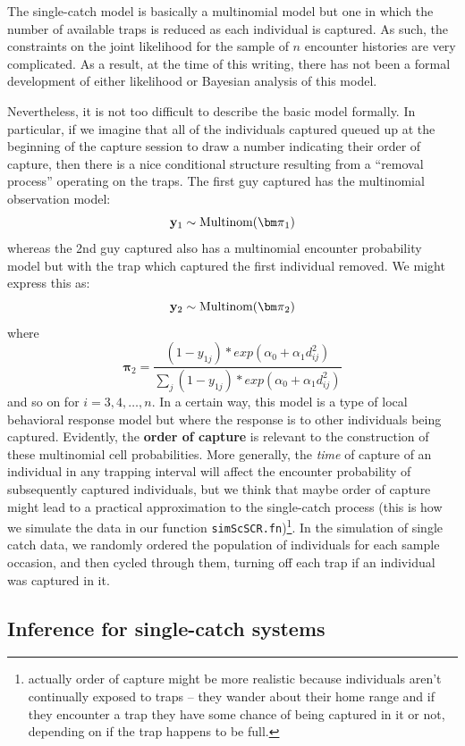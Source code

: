 The single-catch model is basically a multinomial model but one in
which the number of available traps is reduced as each individual is
captured. As such, the constraints on the joint likelihood for the
sample of $n$ encounter histories are very complicated. 
 As a
result, at the time of this writing, there has not been a formal
development of either likelihood or Bayesian analysis of this model.

Nevertheless, it is not too difficult to describe the basic model
formally. In particular, if we imagine that all of the individuals
captured queued up at the beginning of the capture session to draw a
number indicating their order of capture, then there is a nice conditional structure
resulting from a ``removal process'' operating on the traps.  The
first guy captured has the multinomial observation model:
\[
{\bf y}_{1} \sim \mbox{Multinom}({\bm \pi}_{1})
\]
whereas the 2nd guy captured also has a multinomial encounter
probability model but with the trap which captured the first
individual removed. We might express this as:
\[
{\bf y}_{2} \sim \mbox{Multinom}({\bm \pi}_{2})
\]
where
\[
 {\bm \pi}_{2}  = \frac{ (1-y_{1j}) *exp( \alpha_{0} + \alpha_{1}   d_{ij}^{2}) }
{ \sum_{j} (1-y_{1j}) *exp( \alpha_{0} + \alpha_{1}   d_{ij}^{2}) }
\]
and so on for $i=3,4,\ldots,n$.
 In a certain way, this model is a type of local behavioral
response model but where the response is to other individuals being
captured.  
Evidently, the {\bf order of capture} is relevant to the
construction of these multinomial cell probabilities. More generally,
the {\it time} of capture of an individual in any trapping interval
will affect the encounter probability of subsequently captured
individuals, but we think that maybe order of capture might lead to a
practical approximation to the single-catch process (this is how we
simulate the data in our function \mbox{\tt simScSCR.fn})\footnote{actually order of
  capture might be more realistic because individuals aren't
  continually exposed to traps -- they wander about their home range
  and if they encounter a trap they have some chance of being captured
  in it or not, depending on if the trap happens to be full. }. In the
simulation of single catch data, we randomly ordered the population of
individuals for each sample occasion, 
and then cycled through them, turning off each trap if an individual
was captured in it.  


\subsection{Inference for single-catch systems}

